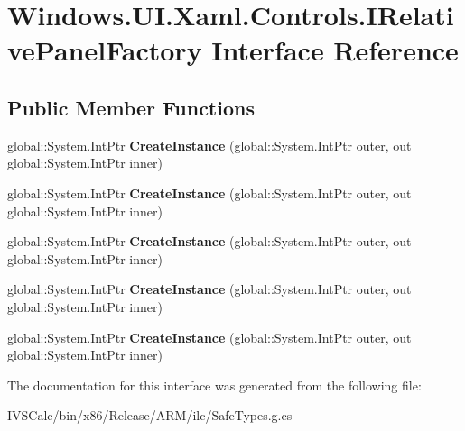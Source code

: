 \hypertarget{interface_windows_1_1_u_i_1_1_xaml_1_1_controls_1_1_i_relative_panel_factory}{}\section{Windows.\+U\+I.\+Xaml.\+Controls.\+I\+Relative\+Panel\+Factory Interface Reference}
\label{interface_windows_1_1_u_i_1_1_xaml_1_1_controls_1_1_i_relative_panel_factory}
\subsection*{Public Member Functions}
\begin{DoxyCompactItemize}
\item 
\mbox{\label{interface_windows_1_1_u_i_1_1_xaml_1_1_controls_1_1_i_relative_panel_factory_ae0c550455eca0683ddc3f06f17ca1988}} 
global\+::\+System.\+Int\+Ptr {\bfseries Create\+Instance} (global\+::\+System.\+Int\+Ptr outer, out global\+::\+System.\+Int\+Ptr inner)
\item 
\mbox{\label{interface_windows_1_1_u_i_1_1_xaml_1_1_controls_1_1_i_relative_panel_factory_ae0c550455eca0683ddc3f06f17ca1988}} 
global\+::\+System.\+Int\+Ptr {\bfseries Create\+Instance} (global\+::\+System.\+Int\+Ptr outer, out global\+::\+System.\+Int\+Ptr inner)
\item 
\mbox{\label{interface_windows_1_1_u_i_1_1_xaml_1_1_controls_1_1_i_relative_panel_factory_ae0c550455eca0683ddc3f06f17ca1988}} 
global\+::\+System.\+Int\+Ptr {\bfseries Create\+Instance} (global\+::\+System.\+Int\+Ptr outer, out global\+::\+System.\+Int\+Ptr inner)
\item 
\mbox{\label{interface_windows_1_1_u_i_1_1_xaml_1_1_controls_1_1_i_relative_panel_factory_ae0c550455eca0683ddc3f06f17ca1988}} 
global\+::\+System.\+Int\+Ptr {\bfseries Create\+Instance} (global\+::\+System.\+Int\+Ptr outer, out global\+::\+System.\+Int\+Ptr inner)
\item 
\mbox{\label{interface_windows_1_1_u_i_1_1_xaml_1_1_controls_1_1_i_relative_panel_factory_ae0c550455eca0683ddc3f06f17ca1988}} 
global\+::\+System.\+Int\+Ptr {\bfseries Create\+Instance} (global\+::\+System.\+Int\+Ptr outer, out global\+::\+System.\+Int\+Ptr inner)
\end{DoxyCompactItemize}


The documentation for this interface was generated from the following file\+:\begin{DoxyCompactItemize}
\item 
I\+V\+S\+Calc/bin/x86/\+Release/\+A\+R\+M/ilc/Safe\+Types.\+g.\+cs\end{DoxyCompactItemize}
